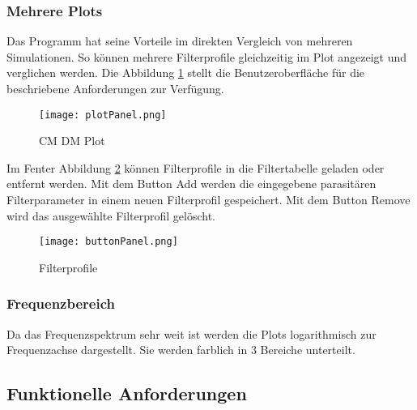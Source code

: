\subsubsection{Mehrere Plots}\label{subsubsec:mehrereplots}
Das Programm hat seine Vorteile im direkten Vergleich von mehreren Simulationen. So können mehrere Filterprofile gleichzeitig im Plot angezeigt und verglichen werden. Die Abbildung \ref{fig:GUIplotPanel} stellt die Benutzeroberfläche für die beschriebene Anforderungen zur Verfügung.
\begin{figure}[H]
	\centering
	\texttt{[image: plotPanel.png]}
	\caption{CM DM Plot}
	\label{fig:GUIplotPanel}
\end{figure}
Im Fenter Abbildung \ref{fig:buttonPanel} können Filterprofile in die Filtertabelle geladen oder entfernt werden. Mit dem Button Add werden die eingegebene parasitären Filterparameter in einem neuen Filterprofil gespeichert. Mit dem Button Remove wird das ausgewählte Filterprofil gelöscht.
\begin{figure}[H]
	\centering
	\texttt{[image: buttonPanel.png]}
	\caption{Filterprofile}
	\label{fig:buttonPanel}
\end{figure}
\bigskip


\subsubsection{Frequenzbereich}\label{subsubsec:frequenzbereich}
Da das Frequenzspektrum sehr weit ist werden die Plots logarithmisch zur Frequenzachse dargestellt. Sie werden farblich in 3 Bereiche unterteilt.
\bigskip
		
\subsection{Funktionelle Anforderungen} \label{subsec:funktionelleanforderungen}

\bigskip
